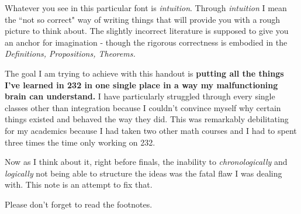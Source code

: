 \documentclass[letter]{article}
\begin{document}
\textsf{Whatever you see in this particular font is \emph{intuition}. Through \emph{intuition} I mean the ``not so correct" way of writing things that will provide you with a rough picture to think about. The slightly incorrect literature is supposed to give you an anchor for imagination - though the rigorous correctness is embodied in the} \emph{Definitions, Propositions, Theorems.}

The goal I am trying to achieve with this handout is \textbf{putting all the things I've learned in 232 in one single place in a way my malfunctioning brain can understand.} I have particularly struggled through every single classes other than integration because I couldn't convince myself why certain things existed and behaved the way they did. This was remarkably debilitating for my academics because I had taken two other math courses and I had to spent three times the time only working on 232. 

Now as I think about it, right before finals, the inability to \emph{chronologically} and \emph{logically} not being able to structure the ideas was the fatal flaw I was dealing with. This note is an attempt to fix that. 

Please don't forget to read the footnotes.
\end{document}
